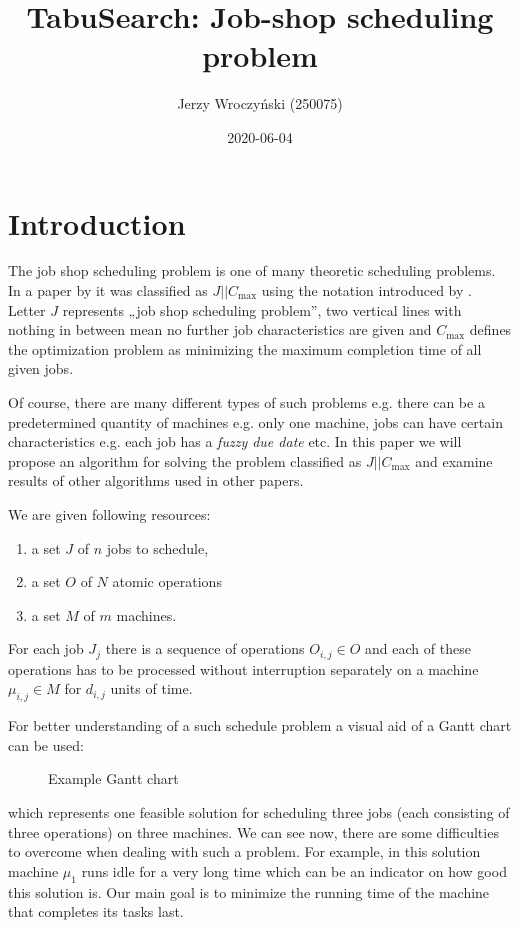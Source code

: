 \documentclass[14pt]{article}
\title{TabuSearch: Job-shop scheduling problem}
\author{Jerzy Wroczyński (250075)}
\date{2020-06-04}
\begin{document}
\maketitle

\section{Introduction}\label{introduction}

The job shop scheduling problem is one of many theoretic scheduling problems. In a paper by \citet{amico-trubian} it was classified as $J || C_{\max}$ using the notation introduced by \citet{graham}. Letter $J$ represents „job shop scheduling problem”, two vertical lines with nothing in between mean no further job characteristics are given and $C_{\max}$ defines the optimization problem as minimizing the maximum completion time of all given jobs.

Of course, there are many different types of such problems e.g. there can be a predetermined quantity of machines e.g. only one machine, jobs can have certain characteristics e.g. each job has a \textit{fuzzy due date} etc. In this paper we will propose an algorithm for solving the problem classified as $J || C_{\max}$ and examine results of other algorithms used in other papers.

\hspace{2pt}

We are given following resources:
\begin{enumerate}
  \item a set $J$ of $n$ jobs to schedule,
  \item a set $O$ of $N$ atomic operations
  \item a set $M$ of $m$ machines.
\end{enumerate}

For each job $J_j$ there is a sequence of operations $O_{i,j} \in O$ and each of these operations has to be processed without interruption separately on a machine $\mu_{i,j} \in M$ for $d_{i,j}$ units of time.

For better understanding of a such schedule problem a visual aid of a Gantt chart can be used:
\begin{figure}[H]
  \centering
  \def\svgwidth{0.5\columnwidth}
  
  \caption{Example Gantt chart}
  \label{example-gantt}
\end{figure}
which represents one feasible solution for scheduling three jobs (each consisting of three operations) on three machines. We can see now, there are some difficulties to overcome when dealing with such a problem. For example, in this solution machine $\mu_1$ runs idle for a very long time which can be an indicator on how good this solution is. Our main goal is to minimize the running time of the machine that completes its tasks last.
\end{document}
